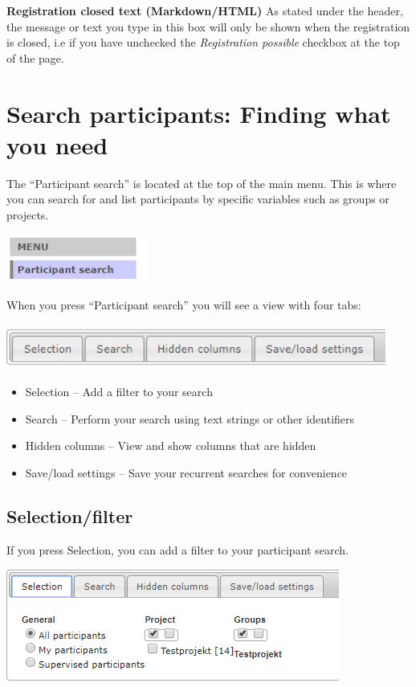 \documentclass[
]{book}
\providecommand{\tightlist}{%
  \setlength{\itemsep}{0pt}\setlength{\parskip}{0pt}}
\begin{document}
\textbf{Registration closed text (Markdown/HTML)}
As stated under the header, the message or text you type in this box will only be shown when the registration is closed, i.e if you have unchecked the \emph{Registration possible} checkbox at the top of the page.

\chapter{Search participants: Finding what you need}\label{search-participants-finding-what-you-need}

The ``Participant search'' is located at the top of the main menu. This is where you can search for and list participants by specific variables such as groups or projects.

\includegraphics{images/search-participants-menu.png}

When you press ``Participant search'' you will see a view with four tabs:

\includegraphics{images/search-participants-tab.png}

\begin{itemize}
\tightlist
\item
  Selection -- Add a filter to your search
\item
  Search -- Perform your search using text strings or other identifiers
\item
  Hidden columns -- View and show columns that are hidden
\item
  Save/load settings -- Save your recurrent searches for convenience
\end{itemize}

\section{Selection/filter}\label{selectionfilter}

If you press Selection, you can add a filter to your participant search.

\includegraphics{images/selection-filter.png}
\end{document}
